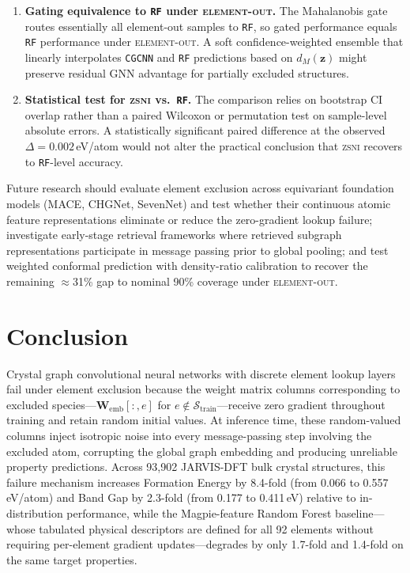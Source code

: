 \documentclass[final,5p,twocolumn,10pt]{elsarticle}
\newcommand{\mae}{\text{MAE}}
\newcommand{\elout}{\textsc{element-out}}
\newcommand{\cgcnn}{\texttt{CGCNN}}
\newcommand{\rf}{\texttt{RF}}
\newcommand{\zsni}{\textsc{zsni}}
\begin{document}
\begin{enumerate}
  on a held-out element-excluded validation partition to avoid this look-ahead.
  Section~\ref{sec:res-ablation} confirms that all $k \in \{1,2,3\}$ yield
  substantial recovery, so the conclusion is not sensitive to the exact optimum.
\item \textbf{Gating equivalence to \rf{} under \elout{}.} The Mahalanobis
  gate routes essentially all element-out samples to \rf{}, so gated performance
  equals \rf{} performance under \elout{}. A soft confidence-weighted ensemble
  that linearly interpolates \cgcnn{} and \rf{} predictions based on $d_M(\bm{z})$
  might preserve residual GNN advantage for partially excluded structures.
\item \textbf{Statistical test for \zsni{} vs.\ \rf{}.} The comparison relies
  on bootstrap CI overlap rather than a paired Wilcoxon or permutation test on
  sample-level absolute errors. A statistically significant paired difference
  at the observed $\Delta = 0.002$\,eV/atom would not alter the practical
  conclusion that \zsni{} recovers \mae{} to \rf{}-level accuracy.
\end{enumerate}

Future research should evaluate element exclusion across equivariant foundation
models (MACE, CHGNet, SevenNet) and test whether their continuous atomic
feature representations eliminate or reduce the zero-gradient lookup failure;
investigate early-stage retrieval frameworks where retrieved subgraph representations
participate in message passing prior to global pooling; and test
weighted conformal prediction with density-ratio calibration to recover
the remaining $\approx$31\% gap to nominal 90\% coverage under \elout{}.

\section{Conclusion}
\label{sec:conclusion}

Crystal graph convolutional neural networks with discrete element lookup layers
fail under element exclusion because the weight matrix columns corresponding
to excluded species---$\bm{W}_{\text{emb}}[:,e]$ for $e \notin \mathcal{S}_{\text{train}}$---receive
zero gradient throughout training and retain random initial values. At inference
time, these random-valued columns inject isotropic noise into every message-passing
step involving the excluded atom, corrupting the global graph embedding and
producing unreliable property predictions. Across 93,902 JARVIS-DFT bulk crystal
structures, this failure mechanism increases Formation Energy \mae{} by 8.4-fold
(from 0.066 to 0.557\,eV/atom) and Band Gap \mae{} by 2.3-fold (from 0.177 to
0.411\,eV) relative to in-distribution performance, while the Magpie-feature
Random Forest baseline---whose tabulated physical descriptors are defined for
all 92 elements without requiring per-element gradient updates---degrades by
only 1.7-fold and 1.4-fold on the same target properties.
\end{document}
